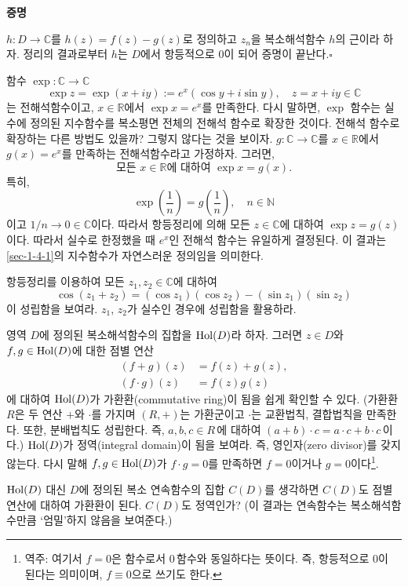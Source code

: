 {\bf 증명}

$h:D\to\mathbb C$를 $h(z) = f(z) - g(z)$로 정의하고
$z_n$을 복소해석함수 $h$의 근이라 하자.
정리의 결과로부터 $h$는 $D$에서 항등적으로 $0$이 되어 증명이 끝난다.\hfill $\square$

\label{ex-page-4-8}
\begin{saltexample}[label=example-4-8]{}{}
함수 $\exp:\mathbb C \to \mathbb C$
\[
\exp z = \exp(x+iy) := e^x (\cos y + i\sin y), \quad
z = x+iy\in \mathbb C
\]
는  전해석함수이고, $x\in \mathbb R$에서 $\exp x = e^x$를 만족한다.
다시 말하면, $\exp$ 함수는 실수에 정의된 지수함수를 복소평면 전체의 전해석 함수로 확장한 것이다.
전해석 함수로 확장하는 다른 방법도 있을까? 그렇지 않다는 것을 보이자.
$g:\mathbb C \to \mathbb C$를  $x\in \mathbb R$에서 $g(x)=e^x$를 만족하는
전해석함수라고 가정하자.
그러면,
\[
\text{모든 } x\in \mathbb R \text{에 대하여 } \exp x = g(x).
\]
특히, 
\[
\exp\left(\dfrac1n\right)=  g\left(\dfrac1n\right), \quad n\in\mathbb N
\]
이고 $1/n \to 0\in \mathbb C$이다.
따라서 항등정리에 의해  모든 $z\in \mathbb C$에 대하여 $\exp z = g(z)$이다.
따라서 실수로 한정했을 때 $e^x$인 전해석 함수는 유일하게 결정된다.
이 결과는 \ref{sec-1-4-1}의 지수함수가 자연스러운 정의임을 의미한다. 
\end{saltexample}

\begin{salt_exercise} \label{ex-4-22}
항등정리를 이용하여 모든 $z_1, z_2 \in \mathbb C$에 대하여
\[
\cos(z_1 + z_2) = (\cos z_1)(\cos z_2) - (\sin z_1)(\sin z_2)
\]
이 성립함을 보여라.
$z_1$, $z_2$가 실수인 경우에 성립함을 활용하라.
\end{salt_exercise}

\begin{salt_exercise} \label{ex-4-23}
영역  $D$에 정의된 복소해석함수의 집합을 $\mathop{\mathrm{Hol}}(D)$라 하자.
그러면 $z\in D$와 $f,g\in \mathop{\mathrm{Hol}}(D)$에 대한 점별 연산
\begin{align*}
(f+g)(z) &=f(z)+g(z), \\
(f\cdot g)(z) &=f(z)g(z)
\end{align*}
에 대하여 $\mathop{\mathrm{Hol}}(D)$가 가환환(commutative ring)이 
됨을 쉽게 확인할 수 있다.
(가환환 $R$은 두 연산 $+$와 $\cdot$를 가지며
$(R,+)$는 가환군이고 $\cdot$는 교환법칙, 결합법칙을 만족한다.
또한, 분배법칙도 성립한다. 즉, $a,b,c\in R$\,에 대하여 $(a+b)\cdot c = a\cdot c + b\cdot c$\,이다.)
$\mathop{\mathrm{Hol}}(D)$가 정역(integral domain)이 됨을 보여라.
즉, 영인자(zero divisor)를 갖지 않는다. 다시 말해 $f,g\in \mathop{\mathrm{Hol}}(D)$가 $f\cdot g=0$를
만족하면 $f=0$이거나 $g=0$이다\footnote{
역주: 여기서 $f=0$은 함수로서 $0$\,함수와 동일하다는 뜻이다.
즉, 항등적으로 $0$이 된다는 의미이며, $f\equiv 0$으로 쓰기도 한다.
}.

$\mathop{\mathrm{Hol}}(D)$ 대신 $D$에 정의된 복소 연속함수의 집합 $C(D)$를 생각하면
$C(D)$도 점별 연산에 대하여 가환환이 된다.
$C(D)$도 정역인가?
(이 결과는 연속함수는 복소해석함수만큼 `엄밀'하지 않음을 보여준다.)
\end{salt_exercise}

